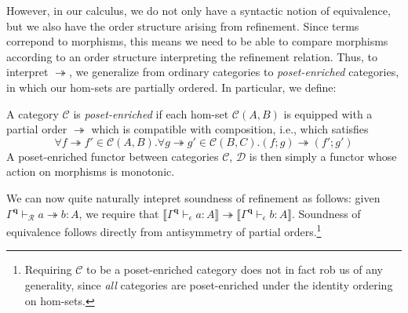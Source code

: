\documentclass[acmsmall,screen,review]{acmart}
\newcommand{\mc}[1]{\ensuremath{\mathcal{#1}}}
\newcommand{\mb}[1]{\ensuremath{\mathbf{#1}}}
\newcommand{\hasty}[4]{#1 \vdash_{#2} #3: {#4}}
\newcommand{\tref}{\twoheadrightarrow}
\newcommand{\cref}{\twoheadrightarrow}
\newcommand{\tmle}[5]{#1 \vdash_{#2} #3 \tref #4 : {#5}}
\newcommand{\dnt}[1]{\llbracket{#1}\rrbracket}
\begin{document}
However, in our calculus, we do not only have a syntactic notion of equivalence, but we also have
the order structure arising from refinement. Since terms correpond to morphisms, this means we need
to be able to compare morphisms according to an order structure interpreting the refinement
relation. Thus, to interpret $\tref$, we generalize from ordinary categories to
\emph{poset-enriched} categories, in which our hom-sets are partially ordered. In particular, we
define:

\begin{definition}
  A category $\mc{C}$ is \emph{poset-enriched} if each hom-set $\mc{C}(A, B)$ is equipped with a
  partial order $\cref$ which is compatible with composition, i.e., which satisfies
  $$
  \forall f \cref f' \in \mc{C}(A, B) . \forall g \tref g' \in \mc{C}(B, C) . 
    (f ; g) \tref (f' ; g')
  $$
  A poset-enriched functor between categories $\mc{C}$, $\mc{D}$ is then simply a functor whose
  action on morphisms is monotonic.
\end{definition}

We can now quite naturally intepret soundness of refinement as follows: given
$\tmle{\Gamma^{\mb{q}}}{\mc{R}}{a}{b}{A}$, we require that
$\dnt{\hasty{\Gamma^{\mb{q}}}{\epsilon}{a}{A}} \cref \dnt{\hasty{\Gamma^{\mb{q}}}{\epsilon}{b}{A}}$.
Soundness of equivalence follows directly from antisymmetry of partial orders.\footnote{Requiring
$\mc{C}$ to be a poset-enriched category does not in fact rob us of any generality, since \emph{all}
categories are poset-enriched under the identity ordering on hom-sets.}
\end{document}
